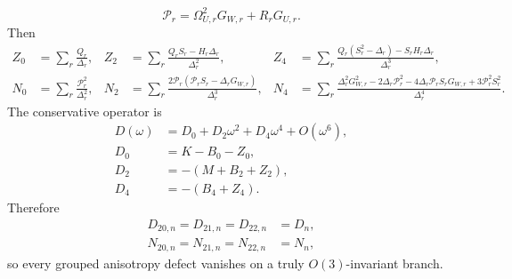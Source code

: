 \begin{equation}
\mathcal P_r=\Omega_{U,r}^2G_{W,r}+R_rG_{U,r}.
\end{equation}
Then
\begin{align}
\label{eq:app-stage024-ZN-moments}
Z_0&=\sum_r\frac{Q_r}{\Delta_r},&
Z_2&=\sum_r\frac{Q_rS_r-H_r\Delta_r}{\Delta_r^2},&
Z_4&=\sum_r\frac{Q_r(S_r^2-\Delta_r)-S_rH_r\Delta_r}{\Delta_r^3},\\
N_0&=\sum_r\frac{\mathcal P_r^2}{\Delta_r^2},&
N_2&=\sum_r\frac{2\mathcal P_r(\mathcal P_rS_r-\Delta_rG_{W,r})}{\Delta_r^3},&
N_4&=\sum_r\frac{\Delta_r^2G_{W,r}^2-2\Delta_r\mathcal P_r^2-4\Delta_r\mathcal P_rS_rG_{W,r}+3\mathcal P_r^2S_r^2}{\Delta_r^4}.
\end{align}
The conservative operator is
\begin{equation}
\label{eq:app-stage024-D-isotropic}
\boxed{
\begin{aligned}
D(\omega)&=D_0+D_2\omega^2+D_4\omega^4+O(\omega^6),\\
D_0&=K-B_0-Z_0,\\
D_2&=-(M+B_2+Z_2),\\
D_4&=-(B_4+Z_4).
\end{aligned}
}
\end{equation}
Therefore
\begin{equation}
\label{eq:app-stage024-isotropic-collapse}
\boxed{
\begin{aligned}
D_{20,n}=D_{21,n}=D_{22,n}&=D_n,\\
N_{20,n}=N_{21,n}=N_{22,n}&=N_n,
\end{aligned}
}
\end{equation}
so every grouped anisotropy defect vanishes on a truly \(O(3)\)-invariant branch.

